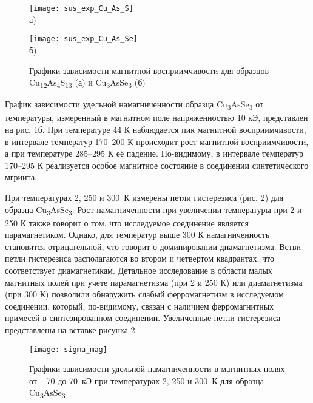 \begin{figure}[p!]
  \begin{minipage}[ht]{0.9\linewidth}\centering
    \texttt{[image: sus\_exp\_Cu\_As\_S]} \\ а)
  \end{minipage}
 \vfill
  \begin{minipage}[ht]{0.9\linewidth}\centering
    \texttt{[image: sus\_exp\_Cu\_As\_Se]} \\ б)
  \end{minipage}
      \caption[Графики зависимости магнитной восприимчивости для образцов Cu\textsubscript{12}As\textsubscript{4}Se\textsubscript{13} (а) и Cu\textsubscript{3}AsS\textsubscript{3} (б)]{Графики зависимости магнитной восприимчивости для образцов Cu\textsubscript{12}As\textsubscript{4}S\textsubscript{13} (а) и Cu\textsubscript{3}AsSe\textsubscript{3} (б)}
    \label{img:magsus1}
\end{figure}

График зависимости удельной намагниченности образца Cu\textsubscript{3}AsSe\textsubscript{3} от температуры, измеренный в магнитном поле напряженностью 10 кЭ, представлен на рис. \ref{img:magsus1}б.
При температуре 44 К наблюдается пик магнитной восприимчивости, в интервале температур 170--200 К происходит рост магнитной восприимчивости, а при температуре 285--295 К её падение.
По-видимому, в интервале температур 170--295 К реализуется особое магнитное состояние в соединении синтетического мгриита.

При температурах 2, 250 и 300~К измерены петли гистерезиса (рис. \ref{img:magsus3}) для образца Cu\textsubscript{3}AsSe\textsubscript{3}.
Рост намагниченности при увеличении температуры при 2 и 250 К также говорит о
том, что исследуемое соединение является парамагнетиком.
Однако, для температур выше 300 К намагниченность становится отрицательной, что
говорит о доминировании диамагнетизма.
 Ветви петли гистерезиса располагаются во втором и четвертом квадрантах, что соответствует диамагнетикам.
Детальное исследование в области малых магнитных полей при учете парамагнетизма (при 2 и 250 К) или диамагнетизма (при 300 К) позволили обнаружить слабый ферромагнетизм в исследуемом соединении, который, по-видимому, связан с наличием ферромагнитных примесей в синтезированном соединении.
Увеличенные петли гистерезиса представлены на вставке рисунка \ref{img:magsus3}.



\begin{figure}[pt!]
  \begin{minipage}[ht]{0.9\linewidth}\centering
    \texttt{[image: sigma\_mag]} \\
  \end{minipage}

      \caption[Графики зависимости удельной намагниченности в магнитных полях от $-$70 до 70~кЭ при температурах 2, 250 и 300~К для образца Cu\textsubscript{3}AsSe\textsubscript{3}]{Графики зависимости удельной намагниченности в магнитных полях от $-$70 до 70~кЭ при температурах 2, 250 и 300~К для образца Cu\textsubscript{3}AsSe\textsubscript{3}}
    \label{img:magsus3}
\end{figure}


